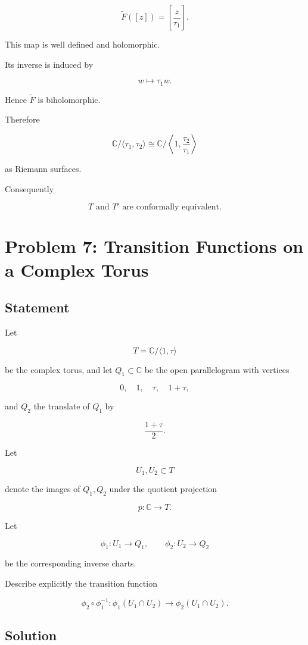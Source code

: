 \documentclass[12pt,a4paper]{article}
\theoremstyle{notespace}
\begin{document}
\[
\widetilde F([z])
=
\left[
\frac{z}{\tau_1}
\right].
\]

This map is well defined and holomorphic.

Its inverse is induced by

\[
w\mapsto\tau_1w.
\]

Hence \(\widetilde F\) is biholomorphic.

Therefore

\[
\boxed{
	\mathbb C/\langle\tau_1,\tau_2\rangle
	\cong
	\mathbb C/
	\left\langle
	1,
	\frac{\tau_2}{\tau_1}
	\right\rangle
}
\]

as Riemann surfaces.

Consequently

\[
\boxed{
	T
	\text{ and }
	T'
	\text{ are conformally equivalent.}
}
\]	
	
\section{Problem 7: Transition Functions on a Complex Torus}

\subsection*{Statement}

Let

\[
T=\mathbb C/\langle 1,\tau\rangle
\]

be the complex torus, and let \(Q_1\subset\mathbb C\) be the open parallelogram with vertices

\[
0,\quad 1,\quad \tau,\quad 1+\tau,
\]

and \(Q_2\) the translate of \(Q_1\) by

\[
\frac{1+\tau}{2}.
\]

Let

\[
U_1,U_2\subset T
\]

denote the images of \(Q_1,Q_2\) under the quotient projection

\[
p:\mathbb C\to T.
\]

Let

\[
\phi_1:U_1\to Q_1,
\qquad
\phi_2:U_2\to Q_2
\]

be the corresponding inverse charts.

Describe explicitly the transition function

\[
\phi_2\circ\phi_1^{-1}:
\phi_1(U_1\cap U_2)
\to
\phi_2(U_1\cap U_2).
\]

\subsection*{Solution}
\end{document}
